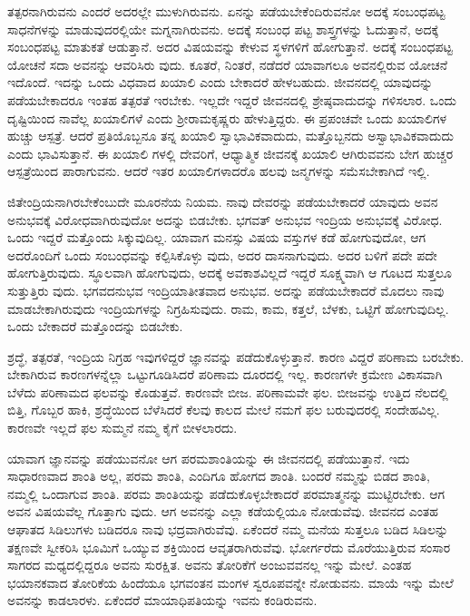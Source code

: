 ತತ್ಪರನಾಗಿರುವನು ಎಂದರೆ ಅದರಲ್ಲೇ ಮುಳುಗಿರುವನು. ಏನನ್ನು ಪಡೆಯಬೇಕೆಂದಿರುವನೋ ಅದಕ್ಕೆ ಸಂಬಂಧಪಟ್ಟ ಸಾಧನೆಗಳನ್ನು ಮಾಡುವುದರಲ್ಲಿಯೇ ಮಗ್ನನಾಗಿರುವನು. ಅದಕ್ಕೆ ಸಂಬಂಧ ಪಟ್ಟ ಶಾಸ್ತ್ರಗಳನ್ನು ಓದುತ್ತಾನೆ, ಅದಕ್ಕೆ ಸಂಬಂಧಪಟ್ಟ ಮಾತುಕತೆ ಆಡುತ್ತಾನೆ. ಅದರ ವಿಷಯವನ್ನು ಕೇಳುವ ಸ್ಥಳಗಳಿಗೆ ಹೋಗುತ್ತಾನೆ. ಅದಕ್ಕೆ ಸಂಬಂಧಪಟ್ಟ ಯೋಚನೆ ಸದಾ ಅವನನ್ನು ಆವರಿಸಿರು ವುದು. ಕೂತರೆ, ನಿಂತರೆ, ನಡೆದರೆ ಯಾವಾಗಲೂ ಅವನಲ್ಲಿರುವ ಯೋಚನೆ ಇದೊಂದೆ. ಇದನ್ನು ಒಂದು ವಿಧವಾದ ಖಯಾಲಿ ಎಂದು ಬೇಕಾದರೆ ಹೇಳಬಹುದು. ಜೀವನದಲ್ಲಿ ಯಾವುದನ್ನು ಪಡೆಯಬೇಕಾದರೂ ಇಂತಹ ತತ್ಪರತೆ ಇರಬೇಕು. ಇಲ್ಲದೇ ಇದ್ದರೆ ಜೀವನದಲ್ಲಿ ಶ್ರೇಷ್ಠವಾದುದನ್ನು ಗಳಿಸಲಾರ. ಒಂದು ದೃಷ್ಟಿಯಿಂದ ನಾವೆಲ್ಲ ಖಯಾಲಿಗಳೆ ಎಂದು ಶ‍್ರೀರಾಮಕೃಷ್ಣರು ಹೇಳುತ್ತಿದ್ದರು. ಈ ಪ್ರಪಂಚವೇ ಒಂದು ಖಯಾಲಿಗಳ ಹುಚ್ಚು ಆಸ್ಪತ್ರೆ. ಆದರೆ ಪ್ರತಿಯೊಬ್ಬನೂ ತನ್ನ ಖಯಾಲಿ ಸ್ವಾಭಾವಿಕವಾದುದು, ಮತ್ತೊಬ್ಬನದು ಅಸ್ವಾಭಾವಿಕವಾದುದು ಎಂದು ಭಾವಿಸುತ್ತಾನೆ. ಈ ಖಯಾಲಿ ಗಳಲ್ಲಿ ದೇವರಿಗೆ, ಆಧ್ಯಾತ್ಮಿಕ ಜೀವನಕ್ಕೆ ಖಯಾಲಿ ಆಗಿರುವವನು ಬೇಗ ಹುಚ್ಚರ ಆಸ್ಪತ್ರೆಯಿಂದ ಪಾರಾಗುವನು. ಆದರೆ ಇತರ ಖಯಾಲಿಗಳಾದರೊ ಹಲವು ಜನ್ಮಗಳನ್ನು ಸಮೆಸಬೇಕಾಗಿದೆ ಇಲ್ಲಿ.

ಜಿತೇಂದ್ರಿಯನಾಗಿರಬೇಕೆಂಬುದೇ ಮೂರನೆಯ ನಿಯಮ. ನಾವು ದೇವರನ್ನು ಪಡೆಯಬೇಕಾದರೆ ಯಾವುದು ಅವನ ಅನುಭವಕ್ಕೆ ವಿರೋಧವಾಗಿರುವುದೋ ಅದನ್ನು ಬಿಡಬೇಕು. ಭಗವತ್ ಅನುಭವ ಇಂದ್ರಿಯ ಅನುಭವಕ್ಕೆ ವಿರೋಧ. ಒಂದು ಇದ್ದರೆ ಮತ್ತೊಂದು ಸಿಕ್ಕುವುದಿಲ್ಲ. ಯಾವಾಗ ಮನಸ್ಸು ವಿಷಯ ವಸ್ತುಗಳ ಕಡೆ ಹೋಗುವುದೋ, ಆಗ ಅದರೊಂದಿಗೆ ಒಂದು ಸಂಬಂಧವನ್ನು ಕಲ್ಪಿಸಿಕೊಳ್ಳು ವುದು, ಅದರ ದಾಸನಾಗುವುದು. ಅದರ ಬಳಿಗೆ ಪದೇ ಪದೇ ಹೋಗುತ್ತಿರುವುದು. ಸ್ಥೂಲವಾಗಿ ಹೋಗುವುದು, ಅದಕ್ಕೆ ಅವಕಾಶವಿಲ್ಲದೆ ಇದ್ದರೆ ಸೂಕ್ಷ್ಮವಾಗಿ ಆ ಗೂಟದ ಸುತ್ತಲೂ ಸುತ್ತುತ್ತಿರು ವುದು. ಭಗವದನುಭವ ಇಂದ್ರಿಯಾತೀತವಾದ ಅನುಭವ. ಅದನ್ನು ಪಡೆಯಬೇಕಾದರೆ ಮೊದಲು ನಾವು ಮಾಡಬೇಕಾಗಿರುವುದು ಇಂದ್ರಿಯಗಳನ್ನು ನಿಗ್ರಹಿಸುವುದು. ರಾಮ, ಕಾಮ, ಕತ್ತಲೆ, ಬೆಳಕು, ಒಟ್ಟಿಗೆ ಹೋಗುವುದಿಲ್ಲ. ಒಂದು ಬೇಕಾದರೆ ಮತ್ತೊಂದನ್ನು ಬಿಡಬೇಕು.

ಶ್ರದ್ಧೆ, ತತ್ಪರತೆ, ಇಂದ್ರಿಯ ನಿಗ್ರಹ ಇವುಗಳಿದ್ದರೆ ಜ್ಞಾನವನ್ನು ಪಡೆದುಕೊಳ್ಳುತ್ತಾನೆ. ಕಾರಣ ವಿದ್ದರೆ ಪರಿಣಾಮ ಬರಬೇಕು. ಬೇಕಾಗಿರುವ ಕಾರಣಗಳನ್ನೆಲ್ಲಾ ಒಟ್ಟುಗೂಡಿಸಿದರೆ ಪರಿಣಾಮ ದೂರದಲ್ಲಿ ಇಲ್ಲ. ಕಾರಣಗಳೇ ಕ್ರಮೇಣ ವಿಕಾಸವಾಗಿ ಬೆಳೆದು ಪರಿಣಾಮದ ಫಲವನ್ನು ಕೊಡುತ್ತವೆ. ಕಾರಣವೇ ಬೀಜ. ಪರಿಣಾಮವೇ ಫಲ. ಬೀಜವನ್ನು ಉತ್ತಿದ ನೆಲದಲ್ಲಿ ಬಿತ್ತಿ, ಗೊಬ್ಬರ ಹಾಕಿ, ಶ್ರದ್ಧೆಯಿಂದ ಬೆಳೆಸಿದರೆ ಕೆಲವು ಕಾಲದ ಮೇಲೆ ನಮಗೆ ಫಲ ಬರುವುದರಲ್ಲಿ ಸಂದೇಹವಿಲ್ಲ. ಕಾರಣವೇ ಇಲ್ಲದೆ ಫಲ ಸುಮ್ಮನೆ ನಮ್ಮ ಕೈಗೆ ಬೀಳಲಾರದು.

ಯಾವಾಗ ಜ್ಞಾನವನ್ನು ಪಡೆಯುವನೋ ಆಗ ಪರಮಶಾಂತಿಯನ್ನು ಈ ಜೀವನದಲ್ಲಿ ಪಡೆಯುತ್ತಾನೆ. ಇದು ಸಾಧಾರಣವಾದ ಶಾಂತಿ ಅಲ್ಲ, ಪರಮ ಶಾಂತಿ, ಎಂದಿಗೂ ಹೋಗದ ಶಾಂತಿ. ಬಂದರೆ ನಮ್ಮನ್ನು ಬಿಡದ ಶಾಂತಿ, ನಮ್ಮಲ್ಲಿ ಒಂದಾಗುವ ಶಾಂತಿ. ಪರಮ ಶಾಂತಿಯನ್ನು ಪಡೆದುಕೊಳ್ಳಬೇಕಾದರೆ ಪರಮಾತ್ಮನನ್ನು ಮುಟ್ಟಿರಬೇಕು. ಆಗ ಅವನ ವಿಷಯವೆಲ್ಲ ಗೊತ್ತಾಗು ವುದು. ಆಗ ಅವನನ್ನು ಎಲ್ಲಾ ಕಡೆಯಲ್ಲಿಯೂ ನೋಡುವೆವು. ಜೀವನದ ಎಂತಹ ಆಘಾತದ ಸಿಡಿಲುಗಳು ಬಡಿದರೂ ನಾವು ಭದ್ರವಾಗಿರುವೆವು. ಏಕೆಂದರೆ ನಮ್ಮ ಮನೆಯ ಸುತ್ತಲೂ ಬಡಿದ ಸಿಡಿಲನ್ನು ತಕ್ಷಣವೇ ಸ್ವೀಕರಿಸಿ ಭೂಮಿಗೆ ಒಯ್ಯುವ ಶಕ್ತಿಯಿಂದ ಆವೃತರಾಗಿರುವೆವು. ಭೋರ್ಗರೆದು ಮೊರೆಯುತ್ತಿರುವ ಸಂಸಾರ ಸಾಗರದ ಮಧ್ಯದಲ್ಲಿದ್ದರೂ ಅವನು ಸುರಕ್ಷಿತ. ಅವನು ತೋರಿಕೆಗೆ ಅಂಜುವವನಲ್ಲ ಇನ್ನು ಮೇಲೆ. ಎಂತಹ ಭಯಾನಕವಾದ ತೋರಿಕೆಯ ಹಿಂದೆಯೂ ಭಗವಂತನ ಮಂಗಳ ಸ್ವರೂಪವನ್ನೇ ನೋಡುವನು. ಮಾಯೆ ಇನ್ನು ಮೇಲೆ ಅವನನ್ನು ಕಾಡಲಾರಳು. ಏಕೆಂದರೆ ಮಾಯಾಧಿಪತಿಯನ್ನು ಇವನು ಕಂಡಿರುವನು.

